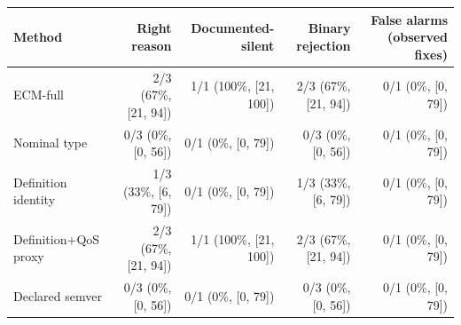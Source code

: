 \begin{tabular}{@{}lrrrr@{}}
\toprule
Method & Right reason & Documented-silent & Binary rejection & False alarms (observed fixes) \\
\midrule
ECM-full & 2/3 (67\%, [21, 94]) & 1/1 (100\%, [21, 100]) & 2/3 (67\%, [21, 94]) & 0/1 (0\%, [0, 79]) \\
Nominal type & 0/3 (0\%, [0, 56]) & 0/1 (0\%, [0, 79]) & 0/3 (0\%, [0, 56]) & 0/1 (0\%, [0, 79]) \\
Definition identity & 1/3 (33\%, [6, 79]) & 0/1 (0\%, [0, 79]) & 1/3 (33\%, [6, 79]) & 0/1 (0\%, [0, 79]) \\
Definition+QoS proxy & 2/3 (67\%, [21, 94]) & 1/1 (100\%, [21, 100]) & 2/3 (67\%, [21, 94]) & 0/1 (0\%, [0, 79]) \\
Declared semver & 0/3 (0\%, [0, 56]) & 0/1 (0\%, [0, 79]) & 0/3 (0\%, [0, 56]) & 0/1 (0\%, [0, 79]) \\
\bottomrule
\end{tabular}